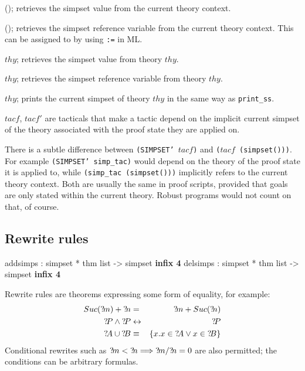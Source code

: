 \begin{ttdescription}
  
\item[\ttindexbold{simpset}();] retrieves the simpset value from the
  current theory context.
  
\item[\ttindexbold{simpset_ref}();] retrieves the simpset reference
  variable from the current theory context.  This can be assigned to
  by using \texttt{:=} in ML.
  
\item[\ttindexbold{simpset_of} $thy$;] retrieves the simpset value
  from theory $thy$.
  
\item[\ttindexbold{simpset_ref_of} $thy$;] retrieves the simpset
  reference variable from theory $thy$.

\item[\ttindexbold{print_simpset} $thy$;] prints the current simpset
  of theory $thy$ in the same way as \texttt{print_ss}.

\item[\ttindexbold{SIMPSET} $tacf$, \ttindexbold{SIMPSET'} $tacf'$]
  are tacticals that make a tactic depend on the implicit current
  simpset of the theory associated with the proof state they are
  applied on.

\end{ttdescription}

\begin{warn}
  There is a subtle difference between \texttt{(SIMPSET'~$tacf$)} and
  \texttt{($tacf$~(simpset()))}.  For example \texttt{(SIMPSET'
    simp_tac)} would depend on the theory of the proof state it is
  applied to, while \texttt{(simp_tac (simpset()))} implicitly refers
  to the current theory context.  Both are usually the same in proof
  scripts, provided that goals are only stated within the current
  theory.  Robust programs would not count on that, of course.
\end{warn}


\subsection{Rewrite rules}
\begin{ttbox}
addsimps : simpset * thm list -> simpset \hfill{\bf infix 4}
delsimps : simpset * thm list -> simpset \hfill{\bf infix 4}
\end{ttbox}

 Rewrite rules are theorems expressing some
form of equality, for example:
\begin{eqnarray*}
  Suc(\Var{m}) + \Var{n} &=&      \Var{m} + Suc(\Var{n}) \\
  \Var{P}\conj\Var{P}    &\bimp&  \Var{P} \\
  \Var{A} \un \Var{B} &\equiv& \{x.x\in \Var{A} \disj x\in \Var{B}\}
\end{eqnarray*}
Conditional rewrites such as ${?\!m}<{?\!n} \Longrightarrow {?\!m}/{?\!n} =
0$ are also permitted; the conditions can be arbitrary formulas.


